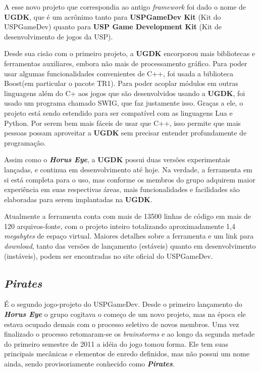 \documentclass[12pt,onecolumn,a4paper]{article}
\begin{document}
        A esse novo projeto que correspondia ao antigo \textit{framework} foi dado o nome de
        \textbf{UGDK}, que é um acrônimo tanto para \textbf{USPGameDev Kit} (Kit do USPGameDev)
        quanto para \textbf{USP Game Development Kit} (Kit de desenvolvimento de jogos da USP).
        
        Desde sua cisão com o primeiro projeto, a \textbf{UGDK} encorporou mais bibliotecas e
        ferramentas auxiliares, embora não mais de processamento gráfico. Para poder usar algumas
        funcionalidades convenientes de C++, foi usada a biblioteca Boost\footnotemark (em
        particular o pacote TR1\footnotemark). Para poder acoplar módulos em outras linguagens além
        do C+ aos jogos que são desenvolvidos usando a \textbf{UGDK}, foi usado um programa chamado
        SWIG\footnotemark, que faz justamente isso. Graças a ele, o projeto está sendo estendido
        para ser compatível com as linguagens Lua e Python\footnotemark. Por serem bem mais fáceis
        de usar que C++, isso permite que mais pessoas possam aproveitar a \textbf{UGDK} sem
        precisar entender profundamente de programação.

        Assim como o \textit{\textbf{Horus Eye}}, a \textbf{UGDK} possui duas versões experimentais
        lançadas, e continua em desenvolvimento até hoje. Na verdade, a ferramenta em si está
        completa para o uso, mas conforme os membros do grupo adquirem maior experiência em suas
        respectivas áreas, mais funcionalidades e facilidades são elaboradas para serem implantadas
        na \textbf{UGDK}.
        
        Atualmente a ferramenta conta com mais de 13500 linhas de código em mais de 120
        arquivos-fonte, com o projeto inteiro totalizando aproximadamente 1,4 \textit{megabytes} de
        espaço virtual. Maiores detalhes sobre a ferramenta e um link para \textit{download}, tanto
        das versões de lançamento (estáveis) quanto em desenvolvimento (instáveis), podem ser        
        encontradas no site oficial do USPGameDev.
    
    \clearpage
    \subsection{\textit{Pirates}}
    \label{sec:pirates}
        É o segundo jogo-projeto do USPGameDev. Desde o primeiro lançamento do
        \textit{\textbf{Horus Eye}} o grupo cogitava o começo de um novo projeto, mas na época ele
        estava ocupado demais com o processo seletivo de novos membros. Uma vez finalizado o
        processo retomaram-se os \textit{brainstorms} e ao longo da segunda metade do primeiro
        semestre de 2011 a idéia do jogo tomou forma. Ele tem suas principais mecânicas e elementos
        de enredo definidos, mas não possui um nome ainda, sendo provisoriamente conhecido como
        \textit{\textbf{Pirates}}.
        
\end{document}
